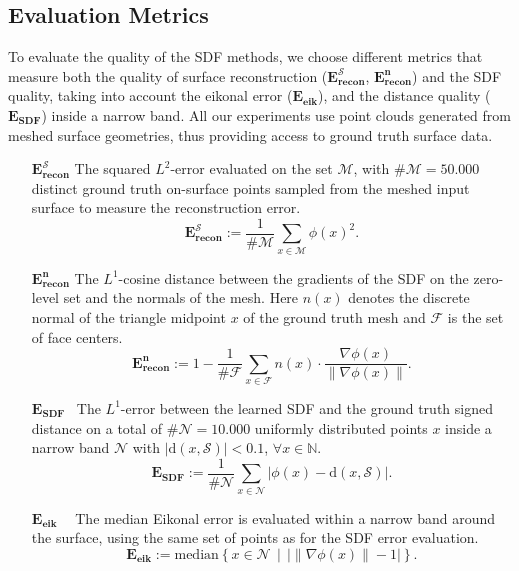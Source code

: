 \documentclass[12pt,openany]{book}
\theoremstyle{plainnormal}
\theoremstyle{remark}
\begin{document}
\subsection{Evaluation Metrics}
To evaluate the quality of the SDF methods, we choose different metrics that measure both the quality of surface reconstruction (\(\mathbf{E_{recon}^{\mathcal{S}}}\), $\mathbf{E_{recon}^n}$) and the SDF quality, taking into account the eikonal error ($\mathbf{E_{eik}}$), and the distance quality ($\mathbf{E_{SDF}}$) inside a narrow band. All our experiments use point clouds generated from meshed surface geometries, thus providing access to ground truth surface data.
\begin{enumerate}[align=left]
\item[\(\mathbf{E_{recon}^{\mathcal{S}}}\)]  The squared $L^2$-error evaluated on the set $\mathcal M$, with $\#\mathcal M = 50.000$ distinct ground truth on-surface points sampled from the meshed input surface to measure the reconstruction error.
 $$\mathbf{E_{recon}^{\mathcal{S}}}:=\frac{1}{\# \mathcal{M} }\sum_{x \in \mathcal{M}} \phi(x)^2.$$
\item[$\mathbf{E_{recon}^n}$] The $L^1$-cosine distance between the gradients of the SDF on the zero-level set and the normals of the mesh. Here $n(x)$ denotes the discrete normal of the triangle midpoint $x$ of the ground truth mesh and $\mathcal{F}$ is the set of face centers. 
$$\mathbf{E_{recon}^n} :=1 - \frac{1}{\#\mathcal{F}} \sum_{x\in \mathcal{F}} n(x)\cdot\frac{\nabla  \phi(x)}{\|\nabla \phi(x)\|}. $$
\item[$\mathbf{E_{SDF}\;\:}$] The $L^1$-error between the learned SDF and the ground truth signed distance on a total of $\#\mathcal N = 10.000$ uniformly distributed points $x$ inside a narrow band $\mathcal{N}$ with $|\mathrm{d}(x, \mathcal{S})| < 0.1$, $\forall x\in \mathbb N$.
$$\mathbf{E_{SDF}} := \frac{1}{\#\mathcal{N}}\sum_{x\in \mathcal{N}}|\phi(x) - \mathrm{d}(x, \mathcal{S})|.$$%
\item[\(\mathbf{E_{\text{eik}}}\ \ \;\:\)] The median Eikonal error is evaluated within a narrow band around the surface, using the same set of points as for the SDF error evaluation.
 $$\mathbf{E_{eik}} := \mathrm{median} \left\{x\in \mathcal{N} \, \mid\,  \big|\|\nabla\phi(x)\| - 1\big|\right\}. $$
\end{enumerate}
\end{document}
